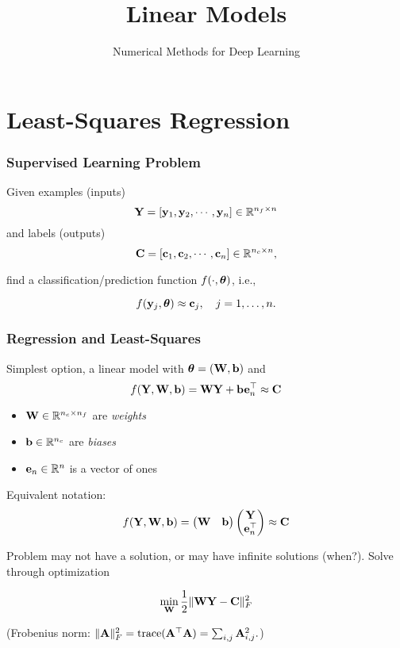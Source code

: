 \documentclass[12pt,fleqn,beamer]{beamer}
\title{Linear Models}
\subtitle{Numerical Methods for Deep Learning}
\date{}
\begin{document}
\makebeamertitle



\section{Least-Squares Regression} 
\label{sec:least_squares_regression}


\begin{frame}\frametitle{Supervised Learning Problem}

Given examples (inputs)
$$ {\bf Y} = \left[{\bf y}_1,  {\bf y}_2 , \cdots, {\bf y}_n \right] \in\mathbb{R}^{n_f\times n}$$
and labels (outputs)
$$ {\bf C} = \left[ {\bf c}_1,  {\bf c}_2, \cdots,  {\bf c}_n \right] \in\mathbb{R}^{n_c\times n},$$

find a classification/prediction function $f(\cdot,{\boldsymbol \theta})$, i.e., 

$$
f({\bf y}_j,{\boldsymbol \theta}) \approx {\bf c}_j, \quad j=1,\ldots,n.
$$

\end{frame}


\begin{frame}\frametitle{Regression and Least-Squares}

Simplest option, a linear model with ${\boldsymbol \theta} = ({\bf W},{\bf b})$ and
$$ f({\bf Y},{\bf W},{\bf b}) =  {\bf W} {\bf Y} + {\bf b} {\bf e}_n^\top \approx {\bf C} $$
\begin{itemize}
	\item ${\bf W} \in \mathbb{R}^{n_c \times n_f}$ are \emph{weights}
	\item ${\bf b} \in \mathbb{R}^{n_c}$ are \emph{biases}
	\item ${\bf e}_n \in \mathbb{R}{^n}$ is a vector of ones
\end{itemize} 
\pause
Equivalent notation:
$$f({\bf Y},{\bf W},{\bf b}) = \begin{pmatrix} {\bf W} & {\bf b} \end{pmatrix} \begin{pmatrix} {\bf Y} \\ {\bf e}_n^\top \end{pmatrix} \approx {\bf C}$$

\pause

Problem may not have a solution, or may have infinite solutions (when?).
Solve through optimization
 
$$ \min_{{\bf W}} {\frac 12} \|{\bf W} {\bf Y} - {\bf C}\|^2_F $$

(Frobenius norm: $\|{\bf A}\|_F^2 = {\rm trace}({\bf A}^{\top} {\bf A}) = \sum_{i,j} {\bf A}_{i,j}^2. $)

\end{frame}
\end{document}
